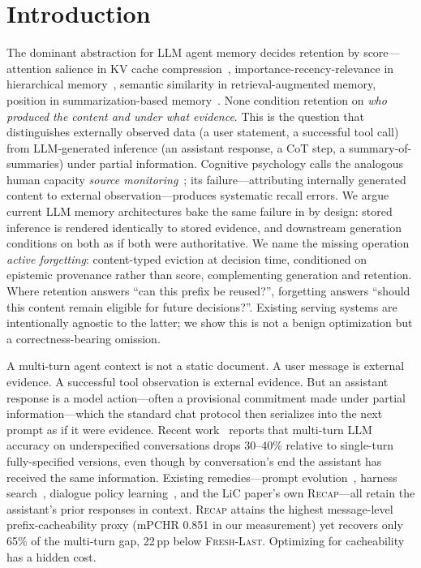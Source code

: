 \documentclass{article}
\begin{document}
\section{Introduction}

The dominant abstraction for LLM agent memory decides retention by score---attention salience in KV cache compression~\citep{kwon2023vllm,zheng2024sglang,liu2025lmcache,zhang2023h2o,xiao2024streamingllm,li2024snapkv}, importance-recency-relevance in hierarchical memory~\citep{packer2023memgpt,li2025memos,park2023generative,memagent2026}, semantic similarity in retrieval-augmented memory, position in summarization-based memory~\citep{wu2023recursivesumm}. None condition retention on \emph{who produced the content and under what evidence}. This is the question that distinguishes externally observed data (a user statement, a successful tool call) from LLM-generated inference (an assistant response, a CoT step, a summary-of-summaries) under partial information. Cognitive psychology calls the analogous human capacity \emph{source monitoring}~\citep{johnson1993source}; its failure---attributing internally generated content to external observation---produces systematic recall errors. We argue current LLM memory architectures bake the same failure in by design: stored inference is rendered identically to stored evidence, and downstream generation conditions on both as if both were authoritative. We name the missing operation \emph{active forgetting}: content-typed eviction at decision time, conditioned on epistemic provenance rather than score, complementing generation and retention. Where retention answers ``can this prefix be reused?'', forgetting answers ``should this content remain eligible for future decisions?''. Existing serving systems are intentionally agnostic to the latter; we show this is not a benign optimization but a correctness-bearing omission.

A multi-turn agent context is not a static document. A user message is external evidence. A successful tool observation is external evidence. But an assistant response is a model action---often a provisional commitment made under partial information---which the standard chat protocol then serializes into the next prompt as if it were evidence. Recent work~\citep{laban2025lost} reports that multi-turn LLM accuracy on underspecified conversations drops 30--40\% relative to single-turn fully-specified versions, even though by conversation's end the assistant has received the same information. Existing remedies---prompt evolution~\citep{agrawal2025gepa}, harness search~\citep{lee2026metaharness, zhang2024aflow}, dialogue policy learning~\citep{chen2024act}, and the LiC paper's own \textsc{Recap}---all retain the assistant's prior responses in context. \textsc{Recap} attains the highest message-level prefix-cacheability proxy (mPCHR 0.851 in our measurement) yet recovers only 65\% of the multi-turn gap, 22\,pp below \textsc{Fresh-Last}. Optimizing for cacheability has a hidden cost.
\end{document}

